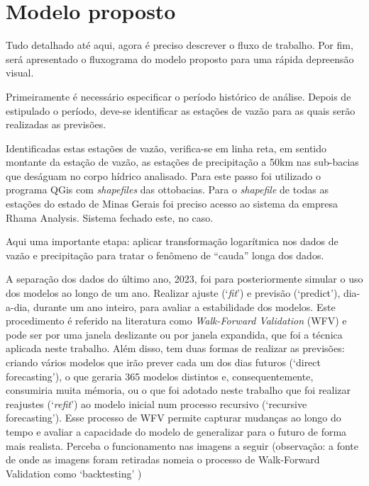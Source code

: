 
\section{Modelo proposto}

Tudo detalhado até aqui, agora é preciso descrever o fluxo de trabalho. Por fim, será apresentado o fluxograma do modelo proposto para uma rápida depreensão visual.
	
Primeiramente é necessário especificar o período histórico de análise. Depois de estipulado o período, deve-se identificar as estações de vazão para as quais serão realizadas as previsões.

Identificadas estas estações de vazão, verifica-se em linha reta, em sentido montante da estação de vazão, as estações de precipitação a 50km nas sub-bacias que deságuam no corpo hídrico analisado. Para este passo foi utilizado o programa QGis com \textit{shapefiles} das ottobacias.\cite{snirh_ottobacia_2024} Para o \textit{shapefile} de todas as estações do estado de Minas Gerais foi preciso acesso ao sistema da empresa Rhama Analysis. Sistema fechado este, no caso.


Aqui uma importante etapa: aplicar transformação logarítmica nos dados de vazão e precipitação para tratar o fenômeno de ``cauda'' longa dos dados.

A separação dos dados do último ano, 2023, foi para posteriormente simular o uso dos modelos ao longo de um ano. Realizar ajuste (`\textit{fit}') e previsão (`predict'), dia-a-dia, durante um ano inteiro, para avaliar a estabilidade dos modelos. Este procedimento é referido na literatura como \textit{Walk-Forward Validation} (WFV) e pode ser por uma janela deslizante ou por janela expandida, que foi a técnica aplicada neste trabalho. Além disso, tem duas formas de realizar as previsões: criando vários modelos que irão prever cada um dos dias futuros (`direct forecasting'), o que geraria 365 modelos distintos e, consequentemente, consumiria muita mémoria, ou o que foi adotado neste trabalho que foi realizar reajustes (`\textit{refit}') ao modelo inicial num processo recursivo (`recursive forecasting'). Esse processo de WFV permite capturar mudanças ao longo do tempo e avaliar a capacidade do modelo de generalizar para o futuro de forma mais realista. Perceba o funcionamento nas imagens a seguir (observação: a fonte de onde as imagens foram retiradas nomeia o processo de Walk-Forward Validation como `backtesting' \cite{skforecast})

